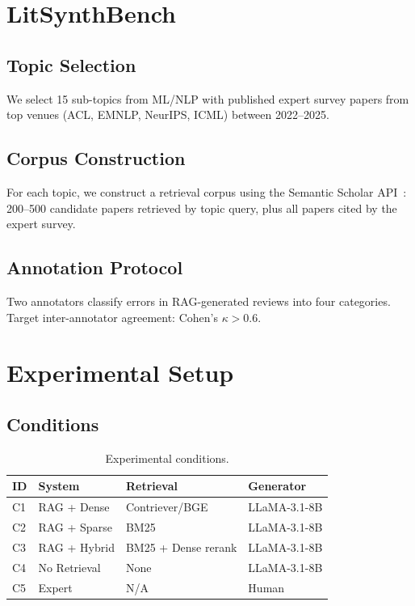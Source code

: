 \documentclass{article}
\begin{document}
\section{LitSynthBench}

\subsection{Topic Selection}
We select 15 sub-topics from ML/NLP with published expert survey papers from
top venues (ACL, EMNLP, NeurIPS, ICML) between 2022--2025.

\subsection{Corpus Construction}
For each topic, we construct a retrieval corpus using the Semantic Scholar
API~\cite{semantic_scholar}: 200--500 candidate papers retrieved by topic query,
plus all papers cited by the expert survey.

\subsection{Annotation Protocol}
Two annotators classify errors in RAG-generated reviews into four categories.
Target inter-annotator agreement: Cohen's $\kappa > 0.6$.

\section{Experimental Setup}

\subsection{Conditions}
\begin{table}[h]
\centering
\caption{Experimental conditions.}
\begin{tabular}{llll}
\toprule
ID & System & Retrieval & Generator \\
\midrule
C1 & RAG + Dense & Contriever/BGE & LLaMA-3.1-8B \\
C2 & RAG + Sparse & BM25 & LLaMA-3.1-8B \\
C3 & RAG + Hybrid & BM25 + Dense rerank & LLaMA-3.1-8B \\
C4 & No Retrieval & None & LLaMA-3.1-8B \\
C5 & Expert & N/A & Human \\
\bottomrule
\end{tabular}
\end{table}
\end{document}

